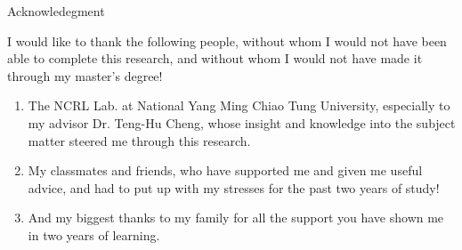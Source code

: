 \newpage
\begin{center}
  \LARGE


    
  Acknowledegment \\[0.5cm]	
\end{center}

\normalsize 
I would like to thank the following people, without whom I would not have been able to complete this research, and without whom I would not have made it through my master's degree!
\begin{enumerate}
  \item The NCRL Lab. at National Yang Ming Chiao Tung University, especially to my advisor Dr. Teng-Hu Cheng, whose insight and knowledge into the subject matter steered me through this research.
  \item My classmates and friends, who have supported me and given me useful advice, and had to put up with my stresses for the past two years of study!
  \item And my biggest thanks to my family for all the support you have shown me in two years of learning.
\end{enumerate}